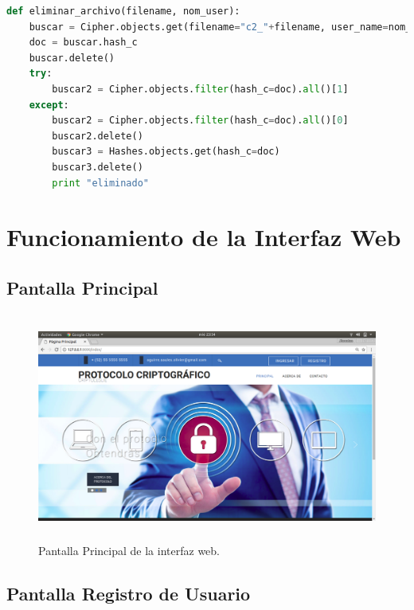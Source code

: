 \begin{lstlisting}[language=Python,frame=single, keywordstyle=\color{blue},breaklines=true, showstringspaces=false]
def eliminar_archivo(filename, nom_user):
    buscar = Cipher.objects.get(filename="c2_"+filename, user_name=nom_user)
    doc = buscar.hash_c
    buscar.delete()
    try:
        buscar2 = Cipher.objects.filter(hash_c=doc).all()[1]
    except:
        buscar2 = Cipher.objects.filter(hash_c=doc).all()[0]
        buscar2.delete()
        buscar3 = Hashes.objects.get(hash_c=doc)
        buscar3.delete()
        print "eliminado"
\end{lstlisting}

\section{Funcionamiento de la Interfaz Web}

\subsection{Pantalla Principal}

			\begin{figure}[H]
			\centering
			\includegraphics[width=14cm, height=7.5cm]{./images/Implementacion/PantallaPrincipal.png}
			\caption{Pantalla Principal de la interfaz web.}
			\label{fig:6-1-2} 
			\end{figure}

\subsection{Pantalla Registro de Usuario}


